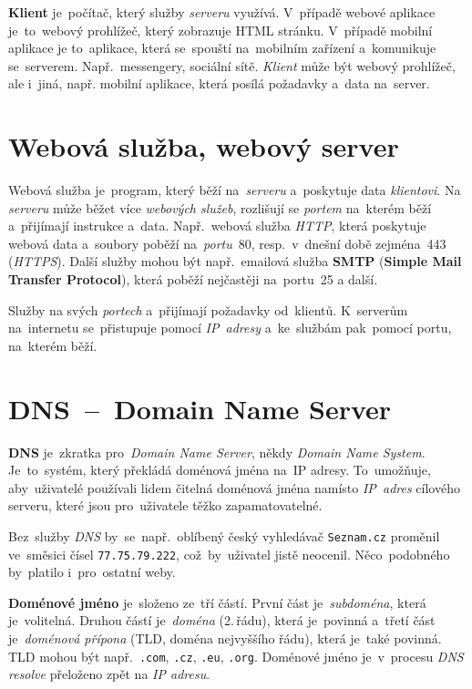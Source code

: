 \documentclass[11pt,a4paper]{report}
\begin{document}
            \textbf{Klient} je~počítač, který služby \emph{serveru} využívá. V~případě webové aplikace je~to~webový prohlížeč, který zobrazuje HTML stránku.
            V~případě mobilní aplikace je to~aplikace, která se~spouští na~mobilním zařízení a~komunikuje se~serverem. Např.~messengery, sociální sítě. \emph{Klient} může být webový prohlížeč, ale i~jiná, např. mobilní aplikace, která posílá požadavky a~data na~server. \cite{ClientServer}

        \section{Webová služba, webový server}
            Webová služba je~program, který běží na~\emph{serveru} a~poskytuje data \emph{klientovi}. Na \emph{serveru} může běžet více \emph{webových služeb}, rozlišují se \emph{portem} na~kterém běží a~přijímají instrukce a~data. Např.~webová služba \emph{HTTP}, která poskytuje webová data a~soubory poběží na~\emph{portu}~80, resp.~v~dnešní době zejména~443 (\emph{HTTPS}). Další služby mohou být např.~emailová služba \textbf{SMTP} (\textbf{Simple Mail Transfer Protocol}), která poběží nejčastěji na~portu~25 a další.
            
            Služby  na svých \emph{portech} a~přijímají požadavky od~klientů. K~serverům na~internetu se~přistupuje pomocí \emph{IP~adresy} a~ke~službám pak~pomocí portu, na~kterém běží. \cite{webserver:mdn}

        \section{DNS~--~Domain Name Server}
            \textbf{DNS} je~zkratka pro~\emph{Domain Name Server}, někdy \emph{Domain Name System}. Je~to~systém, který překládá doménová jména na~IP adresy. To~umožňuje, aby~uživatelé používali lidem čitelná doménová jména namísto \emph{IP~adres} cílového serveru, které jsou pro~uživatele těžko zapamatovatelné.
            
            Bez~služby \emph{DNS} by~se~např.~oblíbený český vyhledávač \texttt{Seznam.cz} proměnil ve~směsici čísel \texttt{77.75.79.222}, což~by~uživatel jistě neocenil. Něco~podobného by~platilo i~pro~ostatní weby.

            \textbf{Doménové jméno} je~složeno ze~tří částí. První část je~\emph{subdoména}, která je~volitelná. Druhou částí je~\emph{doména} (2.\,řádu), která je~povinná a~třetí část je~\emph{doménová přípona} (TLD, doména nejvyššího řádu), která je~také povinná. TLD mohou být např.~\texttt{.com}, \texttt{.cz}, \texttt{.eu}, \texttt{.org}. Doménové jméno je~v~procesu \emph{DNS resolve} přeloženo zpět na \emph{IP adresu}. \cite{tld:mdn}
        
\end{document}
